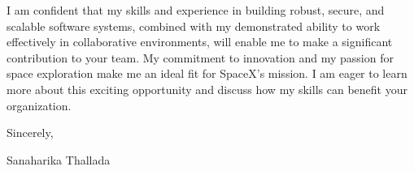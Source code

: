 \documentclass[letterpaper,11pt]{article}
\begin{document}
I am confident that my skills and experience in building robust, secure, and scalable software systems, combined with my demonstrated ability to work effectively in collaborative environments, will enable me to make a significant contribution to your team. My commitment to innovation and my passion for space exploration make me an ideal fit for SpaceX's mission.  I am eager to learn more about this exciting opportunity and discuss how my skills can benefit your organization.

Sincerely,

Sanaharika Thallada
\end{document}
